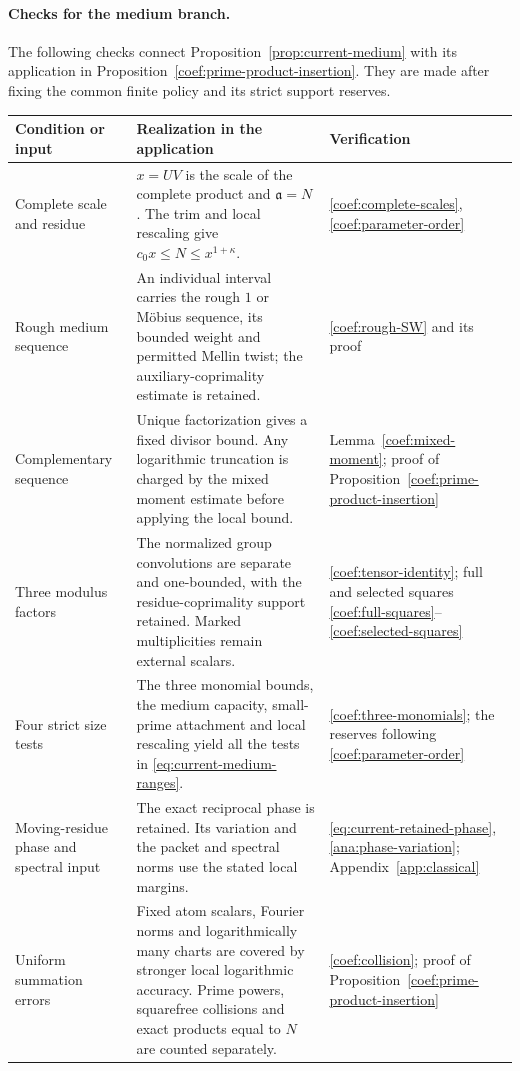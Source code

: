 \paragraph{Checks for the medium branch.}
The following checks connect Proposition~\ref{prop:current-medium} with
its application in Proposition~\ref{coef:prime-product-insertion}. They are
made after fixing the common finite policy and its strict support reserves.
\begingroup
\renewcommand{\LTcaptype}{}
\small
\setlength{\tabcolsep}{4pt}
\begin{longtable}{@{}>{\raggedright\arraybackslash}p{}>{\raggedright\arraybackslash}p{}>{\raggedright\arraybackslash}p{}@{}}
\toprule
 Condition or input & Realization in the application & Verification \\
\midrule
\endhead
\bottomrule
\endfoot
Complete scale and residue & $x=UV$ is the scale of the complete product and $\mathfrak a=N$. The trim and local rescaling give $c_0x\le N\le x^{1+\kappa}$. & \eqref{coef:complete-scales}, \eqref{coef:parameter-order}\\[3pt]
Rough medium sequence & An individual interval carries the rough $1$ or M\"obius sequence, its bounded weight and permitted Mellin twist; the auxiliary-coprimality estimate is retained. & \eqref{coef:rough-SW} and its proof\\[3pt]
Complementary sequence & Unique factorization gives a fixed divisor bound. Any logarithmic truncation is charged by the mixed moment estimate before applying the local bound. & Lemma~\ref{coef:mixed-moment}; proof of Proposition~\ref{coef:prime-product-insertion}\\[3pt]
Three modulus factors & The normalized group convolutions are separate and one-bounded, with the residue-coprimality support retained. Marked multiplicities remain external scalars. & \eqref{coef:tensor-identity}; full and selected squares \eqref{coef:full-squares}--\eqref{coef:selected-squares}\\[3pt]
Four strict size tests & The three monomial bounds, the medium capacity, small-prime attachment and local rescaling yield all the tests in \eqref{eq:current-medium-ranges}. & \eqref{coef:three-monomials}; the reserves following \eqref{coef:parameter-order}\\[3pt]
Moving-residue phase and spectral input & The exact reciprocal phase is retained. Its variation and the packet and spectral norms use the stated local margins. & \eqref{eq:current-retained-phase}, \eqref{ana:phase-variation}; Appendix~\ref{app:classical}\\[3pt]
Uniform summation errors & Fixed atom scalars, Fourier norms and logarithmically many charts are covered by stronger local logarithmic accuracy. Prime powers, squarefree collisions and exact products equal to $N$ are counted separately. & \eqref{coef:collision}; proof of Proposition~\ref{coef:prime-product-insertion}\\[3pt]
\end{longtable}
\endgroup

